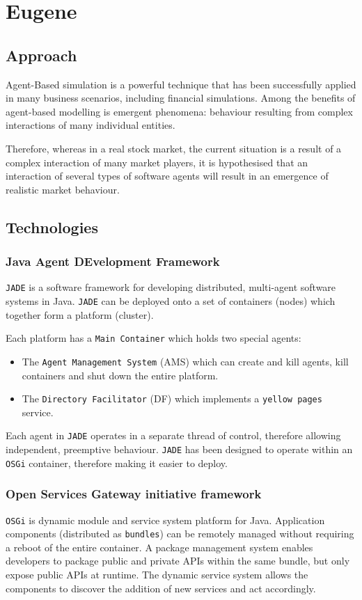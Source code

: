 \section{Eugene}

\subsection{Approach}
Agent-Based simulation is a powerful technique that has been successfully applied in many business scenarios, including financial simulations. Among the benefits of agent-based modelling is emergent phenomena: behaviour resulting from complex interactions of many individual entities. 

Therefore, whereas in a real stock market, the current situation is a result of a complex interaction of many market players, it is hypothesised that an interaction of several types of software agents will result in an emergence of realistic market behaviour.

\subsection{Technologies}
\subsubsection{Java Agent DEvelopment Framework}
\texttt{JADE} is a software framework for developing distributed, multi-agent software systems in Java. \texttt{JADE} can be deployed onto a set of containers (nodes) which together form a platform (cluster).

Each platform has a \texttt{Main Container} which holds two special agents:
\begin{itemize}
\item The \texttt{Agent Management System} (AMS) which can create and kill agents, kill containers and shut down the entire platform.
\item The \texttt{Directory Facilitator} (DF) which implements a \texttt{yellow pages} service.
\end{itemize} 

Each agent in \texttt{JADE} operates in a separate thread of control, therefore allowing independent, preemptive behaviour. \texttt{JADE}  has been designed to operate within an \texttt{OSGi} container, therefore making it easier to deploy.

\subsubsection{Open Services Gateway initiative framework}
\texttt{OSGi} is dynamic module and service system platform for Java. Application components (distributed as \texttt{bundles}) can be remotely managed without requiring a reboot of the entire container. A package management system enables developers to package public and private APIs within the same bundle, but only expose public APIs at runtime. The dynamic service system allows the components to discover the addition of new services and act accordingly.

